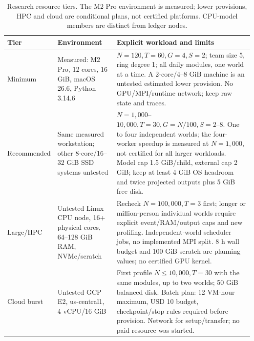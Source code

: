 \begin{table}[tbp]
\centering\small
\caption{Research resource tiers. The M2 Pro environment is measured; lower provisions, HPC and cloud are conditional plans, not certified platforms. CPU-model members are distinct from ledger nodes.}
\label{tab:infrastructure-tiers}
\begin{tabular}{@{}p{}p{}p{}@{}}
\toprule Tier & Environment & Explicit workload and limits \\ \midrule
Minimum & Measured: M2 Pro, 12 cores, 16 GiB, macOS 26.6, Python 3.14.6 & $N=120,T=60,G=4,S=2$; team size 5, ring degree 1; all daily modules, one world at a time. A 2-core/4--8 GiB machine is an untested estimated lower provision. No GPU/MPI/runtime network; keep raw state and traces. \\ \addlinespace
Recommended & Same measured workstation; other 8-core/16--32 GiB SSD systems untested & $N=1{,}000$--$10{,}000,T=30,G=N/100,S=2$--8. One to four independent worlds; the four-worker speedup is measured at $N=1{,}000$, not certified for all larger workloads. Model cap 1.5 GiB/child, external cap 2 GiB; keep at least 4 GiB OS headroom and twice projected outputs plus 5 GiB free disk. \\ \addlinespace
Large/HPC & Untested Linux CPU node, 16+ physical cores, 64--128 GiB RAM, NVMe/scratch & Recheck $N=100{,}000,T=3$ first; longer or million-person individual worlds require explicit event/RAM/output caps and new profiling. Independent-world scheduler jobs, no implemented MPI split. 8 h wall budget and 100 GiB scratch are planning values; no certified GPU kernel. \\ \addlinespace
Cloud burst & Untested GCP E2, us-central1, 4 vCPU/16 GiB & First profile $N\leq10{,}000,T=30$ with the same modules, up to two worlds; 50 GiB balanced disk. Batch plan: 12 VM-hour maximum, USD 10 budget, checkpoint/stop rules required before provision. Network for setup/transfer; no paid resource was started. \\
\bottomrule\end{tabular}
\end{table}
